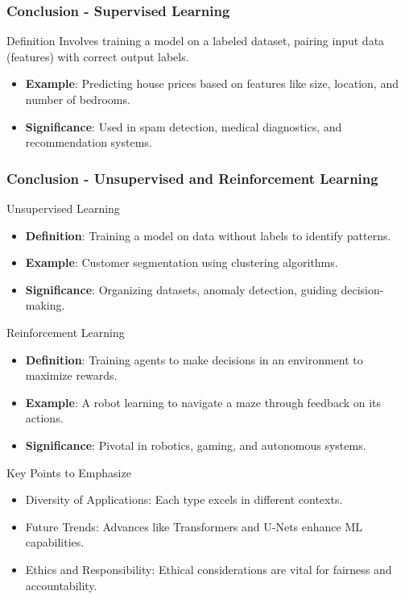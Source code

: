 \documentclass[aspectratio=169]{beamer}
\begin{document}
\begin{frame}[fragile]
    \frametitle{Conclusion - Supervised Learning}
    \begin{block}{Definition}
        Involves training a model on a labeled dataset, pairing input data (features) with correct output labels.
    \end{block}
    
    \begin{itemize}
        \item \textbf{Example}: Predicting house prices based on features like size, location, and number of bedrooms.
        \item \textbf{Significance}: Used in spam detection, medical diagnostics, and recommendation systems.
    \end{itemize}
\end{frame}

\begin{frame}[fragile]
    \frametitle{Conclusion - Unsupervised and Reinforcement Learning}
    \begin{block}{Unsupervised Learning}
        \begin{itemize}
            \item \textbf{Definition}: Training a model on data without labels to identify patterns.
            \item \textbf{Example}: Customer segmentation using clustering algorithms.
            \item \textbf{Significance}: Organizing datasets, anomaly detection, guiding decision-making.
        \end{itemize}
    \end{block}
    
    \begin{block}{Reinforcement Learning}
        \begin{itemize}
            \item \textbf{Definition}: Training agents to make decisions in an environment to maximize rewards.
            \item \textbf{Example}: A robot learning to navigate a maze through feedback on its actions.
            \item \textbf{Significance}: Pivotal in robotics, gaming, and autonomous systems.
        \end{itemize}
    \end{block}
    
    \begin{block}{Key Points to Emphasize}
        \begin{itemize}
            \item Diversity of Applications: Each type excels in different contexts.
            \item Future Trends: Advances like Transformers and U-Nets enhance ML capabilities.
            \item Ethics and Responsibility: Ethical considerations are vital for fairness and accountability.
        \end{itemize}
    \end{block}
\end{frame}
\end{document}
